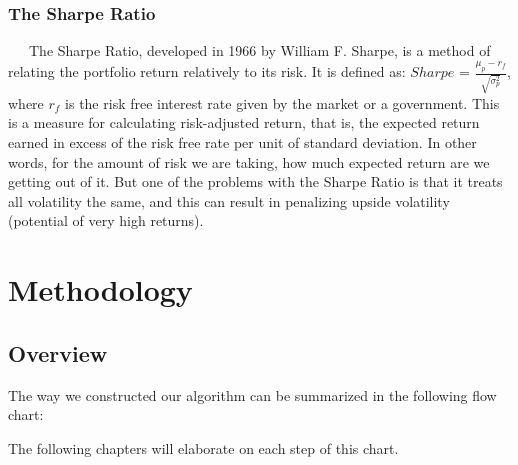 \documentclass[12pt,titlepage,letter]{article}
\begin{document}
		\subsubsection{The Sharpe Ratio}
		\ \ \  The Sharpe Ratio, developed in 1966 by William F. Sharpe, is a method of relating the portfolio return relatively to its risk. It is defined as: $Sharpe$ = $\frac{\mu_p - r_f}{\sqrt{\sigma_p^2}}$, where $r_f$ is the risk free interest rate given by the market or a government.  This is a measure for calculating risk-adjusted return, that is, the expected return earned in excess of the risk free rate per unit of standard deviation. In other words, for the amount of risk we are taking, how much expected return are we getting out of it. But one of the problems with the Sharpe Ratio is that it treats all volatility the same, and this can result in penalizing upside volatility (potential of very high returns).\\

\newpage

\section{Methodology}
	\subsection{Overview}
		The way we constructed our algorithm can be summarized in the following flow chart:
		\begin{center}
		\end{center}
		The following chapters will elaborate on each step of this chart.
	
\end{document}
